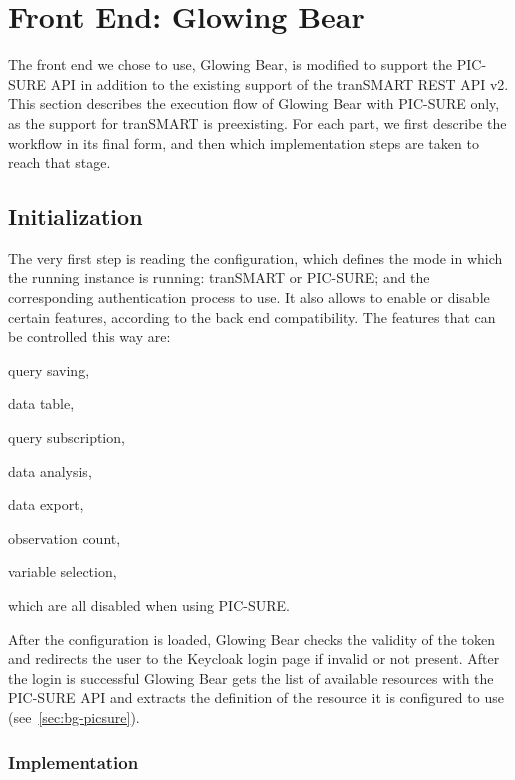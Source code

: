 
\section{Front End: Glowing Bear}
\label{sec:interoplayer-gb}

The front end we chose to use, Glowing Bear, is modified to support the PIC-SURE API in addition to the existing support of the tranSMART REST API v2.
This section describes the execution flow of Glowing Bear with PIC-SURE only, as the support for tranSMART is preexisting.
For each part, we first describe the workflow in its final form, and then which implementation steps are taken to reach that stage.

\subsection{Initialization}

The very first step is reading the configuration, which defines the mode in which the running instance is running: tranSMART or PIC-SURE; and the corresponding authentication process to use.
It also allows to enable or disable certain features, according to the back end compatibility.
The features that can be controlled this way are:
\begin{enumerate*}
    \item query saving,
    \item data table,
    \item query subscription,
    \item data analysis,
    \item data export,
    \item observation count,
    \item variable selection,
\end{enumerate*}
which are all disabled when using PIC-SURE.

After the configuration is loaded, Glowing Bear checks the validity of the token and redirects the user to the Keycloak login page if invalid or not present.
After the login is successful Glowing Bear gets the list of available resources with the PIC-SURE API and extracts the definition of the resource it is configured to use (see~\ref{sec:bg-picsure}).


\subsubsection{Implementation}

